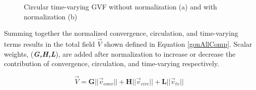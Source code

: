 \documentclass[numbered,pdftex]{ohio-etd}
\begin{document}
\begin{figure}[H]
	\begin{subfigmatrix}{2}%
		\centering	
		\hspace*{0mm}
	\end{subfigmatrix}
	\caption{Circular time-varying GVF without normalization (a) and with normalization (b)}
	\label{fig:gvfCircTimeVarying}
\end{figure}

Summing together the normalized convergence, circulation, and time-varying terms results in the total field $\vec{V}$ shown defined in Equation \ref{gonAllComp}. Scalar weights, (\textit{\textbf{G,H,L}}), are added after normalization to increase or decrease the contribution of convergence, circulation, and time-varying respectively. 

\begin{equation}
\vec{V} = \boldsymbol{G}||\vec{v}_{conv}|| + \boldsymbol{H}||\vec{v}_{circ}|| +  \boldsymbol{L}||\vec{v}_{tv}|| 
\label{gonAllComp}
\end{equation}
\end{document}
